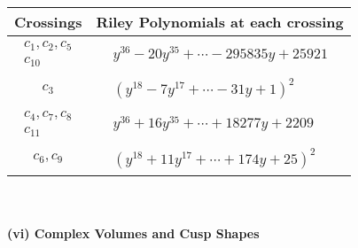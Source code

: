 \documentclass[1p]{elsarticle_modified}
\theoremstyle{definition}
\begin{document}
\begin{tabular}{m{50pt}|m{274pt}}
Crossings & \hspace{64pt}Riley Polynomials at each crossing \\
\hline $$\begin{aligned}c_{1},c_{2},c_{5}\\c_{10}\end{aligned}$$&$\begin{aligned}
&y^{36}-20 y^{35}+\cdots-295835 y+25921
\end{aligned}$\\
\hline $$\begin{aligned}c_{3}\end{aligned}$$&$\begin{aligned}
&(y^{18}-7 y^{17}+\cdots-31 y+1)^{2}
\end{aligned}$\\
\hline $$\begin{aligned}c_{4},c_{7},c_{8}\\c_{11}\end{aligned}$$&$\begin{aligned}
&y^{36}+16 y^{35}+\cdots+18277 y+2209
\end{aligned}$\\
\hline $$\begin{aligned}c_{6},c_{9}\end{aligned}$$&$\begin{aligned}
&(y^{18}+11 y^{17}+\cdots+174 y+25)^{2}
\end{aligned}$\\
\hline
\end{tabular}\\~\\
\newpage\flushleft \textbf{(vi) Complex Volumes and Cusp Shapes}
\end{document}
